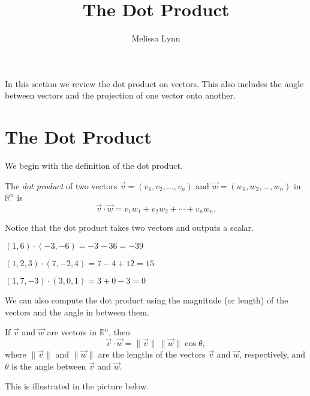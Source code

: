 \documentclass{ximera}
\title{The Dot Product}
\author{Melissa Lynn}
\begin{document}
  
\begin{abstract}  
\end{abstract}  
\maketitle 

In this section we review the dot product on vectors. This also includes the angle between vectors and the projection of one vector onto another.

\section*{The Dot Product}

We begin with the definition of the dot product.

\begin{definition}
The \emph{dot product} of two vectors $\vec{v} = (v_1,v_2,...,v_n)$ and $\vec{w} = (w_1,w_2,...,w_n)$ in $\mathbb{R}^n$ is
\[
\vec{v}\cdot\vec{w} = v_1w_1+v_2w_2+\cdots + v_nw_n.
\]
\end{definition}

Notice that the dot product takes two vectors and outputs a scalar.

\begin{example}
$(1,6)\cdot (-3,-6) = -3-36=-39$

$(1,2,3)\cdot (7,-2,4) = 7-4+12=15$

$(1,7,-3)\cdot (3,0,1) = 3+0-3=0$
\end{example}

We can also compute the dot product using the magnitude (or length) of the vectors and the angle in between them.

\begin{proposition}
If $\vec{v}$ and $\vec{w}$ are vectors in $\mathbb{R}^n$, then
\[
\vec{v}\cdot\vec{w} = \|\vec{v}\|\,\|\vec{w}\|\cos\theta,
\]
where $\|\vec{v}\|$ and $\|\vec{w}\|$ are the lengths of the vectors $\vec{v}$ and $\vec{w}$, respectively, and $\theta$ is the angle between $\vec{v}$ and $\vec{w}$.
\end{proposition}

This is illustrated in the picture below.

\begin{image}
\end{image}
\end{document}
